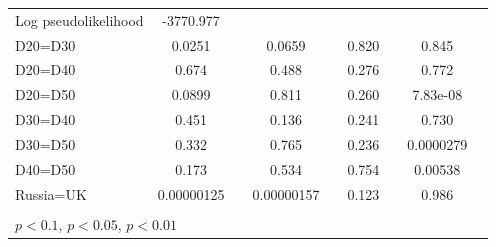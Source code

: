 \begin{tabular}{l|cccccc|cc}
Log pseudolikelihood  &  -3770.977  &         &                  &         &                  &         &           &   \\ 
D20=D30         &   0.0251         &         &   0.0659         &         &    0.820         &         &    0.845         &         \\
D20=D40         &    0.674         &         &    0.488         &         &    0.276         &         &    0.772         &         \\
D20=D50         &   0.0899         &         &    0.811         &         &    0.260         &         & 7.83e-08         &         \\
D30=D40         &    0.451         &         &    0.136         &         &    0.241         &         &    0.730         &         \\
D30=D50         &    0.332         &         &    0.765         &         &    0.236         &         &0.0000279         &         \\
D40=D50         &    0.173         &         &    0.534         &         &    0.754         &         &  0.00538         &         \\
Russia=UK       &0.00000125         &         &0.00000157         &         &    0.123         &         &    0.986         &         \\
\hline\hline
\multicolumn{9}{p{16cm}}{\tiny }\\
\multicolumn{9}{l}{\tiny \sym{*} \(p<0.1\), \sym{**} \(p<0.05\), \sym{***} \(p<0.01\)}\\
\end{tabular}